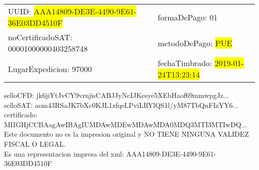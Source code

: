 \documentclass{article}
\begin{document}
\begin{tabular}{p{11cm}p{1cm}p{8cm}}
\bigskip
UUID: \colorbox{yellow}{ AAA14809-DE3E-4490-9E61-36E03DD4510F } & & formaDePago: 01\\

noCertificadoSAT: 00001000000403258748 & & metodoDePago: \colorbox{yellow}{ PUE }\\

LugarExpedicion: 97000 & & fechaTimbrado: \colorbox{yellow}{ 2019-01-24T13:23:14 } \\
\end{tabular}

\bigskip
selloCFD: jk6jiYtJvCY9vrnjisCABJJyNcIJKesye5XEbHaof69mmwpgJz... \\
selloSAT: aom43RSaJK7bXc0KJL1zfqeLPviLRYlQS1l/yM87TbQnFIzYY6... \\

certificado: MIIGHjCCBAagAwIBAgIUMDAwMDEwMDAwMDA0MDQ3MTI3MTIwDQ...\bigskip\bigskip\bigskip\bigskip\bigskip\bigskip
\\Este documento no es la impresion original y NO TIENE NINGUNA VALIDEZ FISCAL O LEGAL. \\
 Es una representacion impresa del xml:  AAA14809-DE3E-4490-9E61-36E03DD4510F \\
\end{document}
